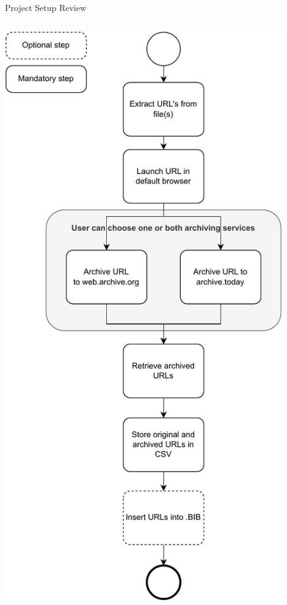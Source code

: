 \documentclass[
ngerman,%
authorontitle=true,
]{bfhbeamer}
\begin{document}
\begin{frame}{Project Setup Review}
\begin{columns}
\begin{column}{0.23\textwidth}
\begin{center}
					\includegraphics[width=0.9\textwidth]{figures/process_model-simple-vertikal}
				\end{center}
			\end{column}
		\end{columns}
	\end{frame}
	
\end{document}
